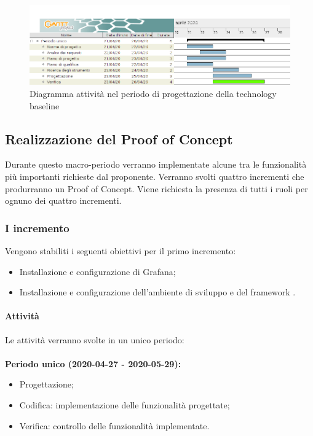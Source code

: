 \documentclass[../piano-di-progetto.tex]{subfiles}
\begin{document}
    


\newpage
\begin{landscape}
    \begin{figure}[H]
        \centering
        \includegraphics[width=24cm]{img/progettazione.png}
        \caption{Diagramma attività nel periodo di progettazione della technology baseline}
      \end{figure}
\end{landscape}

    
\newpage
\subsection{Realizzazione del Proof of Concept}

Durante questo macro-periodo verranno implementate alcune tra le funzionalità più importanti richieste dal proponente. Verranno svolti quattro incrementi che produrranno un Proof of Concept. Viene richiesta la presenza di tutti i ruoli per ognuno dei quattro incrementi.

\subsubsection{I incremento} 

 Vengono stabiliti i seguenti obiettivi per il primo incremento:
 \begin{itemize}
     \item Installazione e configurazione di Grafana;
     \item Installazione e configurazione dell'ambiente di sviluppo  e del framework .
 \end{itemize}
 
\paragraph{Attività}
Le attività verranno svolte in un unico periodo:
\\
\\
\textbf{Periodo unico (2020-04-27 - 2020-05-29):}
\begin{itemize}
    \item Progettazione;
    \item Codifica: implementazione delle funzionalità progettate;
    \item Verifica: controllo delle funzionalità implementate.
\end{itemize}
\end{document}
